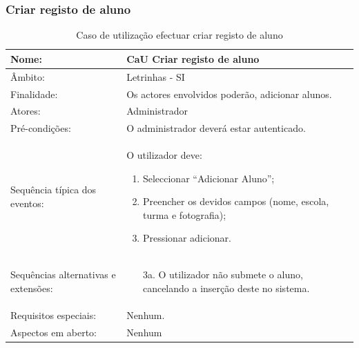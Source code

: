 \documentclass[a4paper]{article}
\begin{document}
	\subsubsection{Criar registo de aluno}
			\begin {table}[h]
									\begin{tabular}{|p{2cm} p{10cm}|}
										\hline Nome: & CaU Criar registo de aluno\\ 
										\hline Âmbito: & Letrinhas - SI \\ 
										\hline Finalidade: & Os actores envolvidos poderão, adicionar alunos.  \\ 
										\hline Atores: & Administrador \\ 
									    \hline Pré-condições: & O administrador deverá estar autenticado.\\ 
									    \hline Sequência típica dos eventos: &  					
										O utilizador deve:
									    \begin{enumerate}
									    \item	Seleccionar “Adicionar Aluno”;
										\item	Preencher os devidos  campos (nome, escola, turma e fotografia);
										\item	Pressionar adicionar.


		
			
									    \end{enumerate} \\ 
					  				    \hline Sequências alternativas e extensões: & 
					  				    \begin{enumerate}			    	
					  				  \item[3a.] O utilizador não submete o aluno, cancelando a inserção deste no sistema.
		
			
					
					  				    \end{enumerate}
					  				     \\ 
					  				    \hline Requisitos especiais: & Nenhum.\\ 
					  				    \hline Aspectos em aberto: & Nenhum  \\
										\hline 
									\end{tabular}
									\caption{Caso de utilização efectuar criar registo de aluno}
								\end{table} 
	
	
	

\newpage
\end{document}
